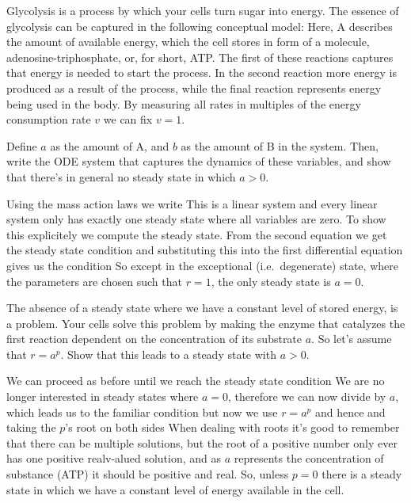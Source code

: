 Glycolysis is a process by which your cells turn sugar into energy. The essence of glycolysis can be captured in the following conceptual model: 
Here, A describes the amount of available energy, which the cell stores in form of a molecule, adenosine-triphosphate, or, for short, ATP.
The first of these reactions captures that energy is needed to start the process. In the second reaction more energy is produced as a result of the process, while the final reaction represents energy being used in the body. By measuring all rates in multiples of the energy consumption rate $v$ we can fix $v=1$. 

\subquestion 
Define $a$ as the amount of A, and $b$ as the amount of B in the system. Then, write the ODE system that captures the dynamics of these variables, and show that there's in general no steady state in which $a>0$. 

\solution
Using the mass action laws we write 
This is a linear system and every linear system only has exactly one steady state where all variables are zero. To show this explicitely we compute the steady state. From the second equation we get the steady state condition
and substituting this into the first differential equation gives us the condition
So except in the exceptional (i.e.~degenerate) state, where the parameters are chosen such that $r=1$, the only steady state is $a=0$.

\subquestion 
The absence of a steady state where we have a constant level of stored energy, is a problem. Your cells solve this problem by making the enzyme that catalyzes the first reaction dependent on the concentration of its substrate $a$. So let's assume that $r=a^p$. Show that this leads to a steady state with $a>0$.

\solution 
We can proceed as before until we reach the steady state condition
We are no longer interested in steady states where $a=0$, therefore we can now divide by $a$, which leads us to the familiar condition 
but now we use $r=a^p$ and hence 
and taking the $p$'s root on both sides
When dealing with roots it's good to remember that there can be multiple solutions, but the root of a positive number only ever has one positive realv-alued solution, and as $a$ represents the concentration of substance (ATP) it should be positive and real. So, unless $p=0$ there is a steady state in which we have a constant level of energy available in the cell.  

